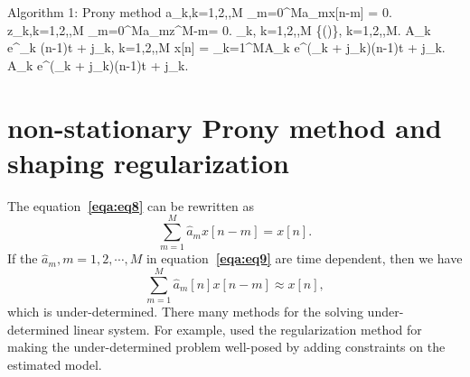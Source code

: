 \begin{algorithm}{Algorithm 1: Prony method}{}
      \displaystyle a_k,k=1,2,\cdots,M \gets \sum_{m=0}^{M}a_mx[n-m] = 0.
      \displaystyle z_k,k=1,2,\cdots,M \gets \sum_{m=0}^{M}a_mz^{M-m}= 0.
      \displaystyle
     \omega_k, k=1,2,\cdots,M \gets \Re\left\{\left(\right)\right\}, k=1,2,\cdots,M.
      \displaystyle
     A_k e^{\alpha_k (n-1)\Delta t + j\phi_k}, k=1,2,\cdots,M \gets 
     x[n] = \sum_{k=1}^{M}A_k e^{(\alpha_k + j\omega_k)(n-1)\Delta t + j\phi_k}.
      \displaystyle
     A_k e^{(\alpha_k + j\omega_k)(n-1)\Delta t + j\phi_k}.
\end{algorithm}


\section{non-stationary Prony method and shaping regularization}
The equation\textbf{~\ref{eqa:eq8}} can be rewritten as
\begin{equation}
    \label{eqa:eq9}
\sum_{m=1}^{M}\hat{a}_m x[n-m] = x[n].
\end{equation}
If the $\hat{a}_m, m=1,2,\cdots,M$ in equation\textbf{~\ref{eqa:eq9}} are time dependent, then we have
\begin{equation}
    \label{eqa:eq10}
    \sum_{m=1}^{M}\hat{a}_m[n] x[n-m] \approx x[n],
\end{equation}
which is under-determined. There many methods for the solving 
under-determined linear system. For example, \citet[]{tikhonov} 
used the regularization method for making the under-determined 
problem well-posed by adding constraints on the estimated model.
